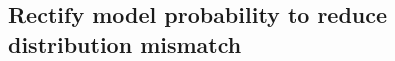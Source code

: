 \subsection{Rectify model probability to reduce distribution mismatch}
\label{sect:approximate-true-distribution}






    
